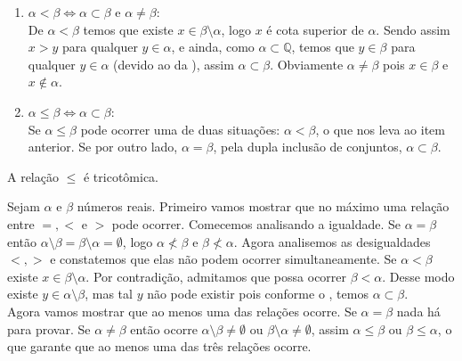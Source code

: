 \documentclass[../main.tex]{subfiles}
\begin{document}
\begin{dem}
    \begin{enumerate}[label=(\roman*)]
        \item\label{reais-dummy-subset} $\alpha < \beta \iff \alpha \subset \beta$ e $\alpha \neq \beta$: \\
        De $\alpha < \beta$ temos que existe $x \in \beta \setminus \alpha$, logo $x$ é cota superior de $\alpha$. Sendo assim $x > y$ para qualquer $y \in \alpha$, e ainda, como $\alpha \subset \mathbb{Q}$, temos que $y \in \beta$ para qualquer $y \in \alpha$ (devido ao  da ), assim $\alpha \subset \beta$. Obviamente $\alpha \neq \beta$ pois $x \in \beta$ e $x \not\in \alpha$.
        \item $\alpha \leq \beta \iff \alpha \subset \beta$: \\
        Se $\alpha \leq \beta$ pode ocorrer uma de duas situações: $\alpha < \beta$, o que nos leva ao item anterior. Se por outro lado, $\alpha = \beta$, pela dupla inclusão de conjuntos, $\alpha \subset \beta$. 
    \end{enumerate}
\end{dem}

\begin{teo}\label{reais-teo-ordemTricotomica}
    A relação $\leq$ é tricotômica.
\end{teo}
\begin{dem}
    Sejam $\alpha$ e $\beta$ números reais.
    Primeiro vamos mostrar que no máximo uma relação entre $=, <$ e $>$ pode ocorrer.
    Comecemos analisando a igualdade. Se $\alpha = \beta$ então $\alpha \setminus \beta = \beta \setminus \alpha = \emptyset$, logo $\alpha \not< \beta$ e $\beta \not< \alpha$.
    Agora analisemos as desigualdades $<, >$ e constatemos que elas não podem ocorrer simultaneamente. Se $\alpha < \beta$ existe $x \in \beta \setminus \alpha$. Por contradição, admitamos que possa ocorrer $\beta < \alpha$. Desse modo existe $y \in \alpha \setminus \beta$, mas tal $y$ não pode existir pois conforme o , temos $\alpha \subset \beta$. \\

    Agora vamos mostrar que ao menos uma das relações ocorre. Se $\alpha = \beta$ nada há para provar. Se $\alpha \neq \beta$ então ocorre $\alpha \setminus \beta \neq \emptyset$ ou $\beta \setminus \alpha \neq \emptyset$, assim $\alpha \leq \beta$ ou $\beta \leq \alpha$, o que garante que ao menos uma das três relações ocorre.
\end{dem}
\end{document}
